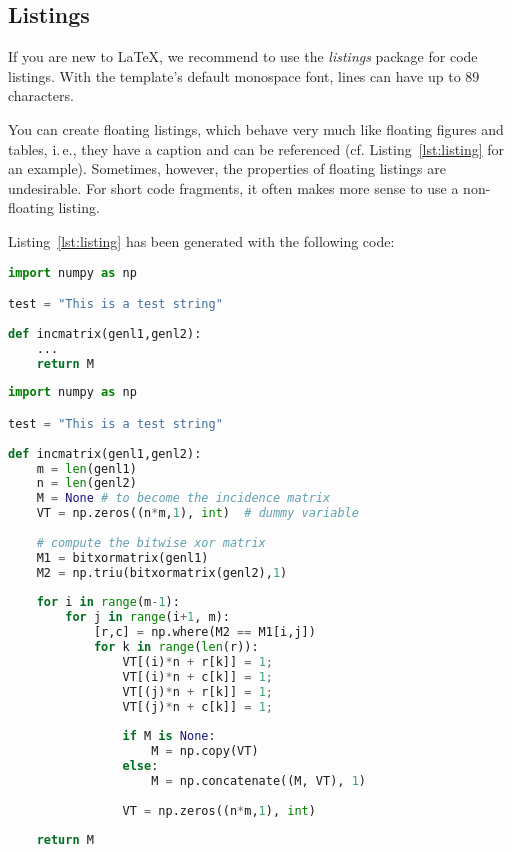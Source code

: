 \subsection{Listings}

If you are new to LaTeX,%
we recommend to use the \emph{listings} package for code listings. With the template's default monospace font, lines can have up to 89 characters.

You can create floating listings, which behave very much like floating figures and tables, i.\,e., they have a caption and can be referenced (cf. Listing~\ref{lst:listing} for an example). Sometimes, however, the properties of floating listings are undesirable. For short code fragments, it often makes more sense to use a non-floating listing.

Listing~\ref{lst:listing} has been generated with the following code:
\begin{latex}
\begin{lstlisting}[language=Python,float=t,
  caption={This is an example of syntax highlighting of
  Python code with a relatively long caption},label={lst:listing}]
import numpy as np

test = "This is a test string"
 
def incmatrix(genl1,genl2):
    ...
    return M
\end{lstlisting}
\end{latex}

\begin{lstlisting}[language=Python,float=t,
  caption={This is an example of syntax highlighting of
  Python code with a relatively long caption},label={lst:listing}]
import numpy as np

test = "This is a test string"
 
def incmatrix(genl1,genl2):
    m = len(genl1)
    n = len(genl2)
    M = None # to become the incidence matrix
    VT = np.zeros((n*m,1), int)  # dummy variable
 
    # compute the bitwise xor matrix
    M1 = bitxormatrix(genl1)
    M2 = np.triu(bitxormatrix(genl2),1) 
 
    for i in range(m-1):
        for j in range(i+1, m):
            [r,c] = np.where(M2 == M1[i,j])
            for k in range(len(r)):
                VT[(i)*n + r[k]] = 1;
                VT[(i)*n + c[k]] = 1;
                VT[(j)*n + r[k]] = 1;
                VT[(j)*n + c[k]] = 1;
 
                if M is None:
                    M = np.copy(VT)
                else:
                    M = np.concatenate((M, VT), 1)
 
                VT = np.zeros((n*m,1), int)
 
    return M
\end{lstlisting}


